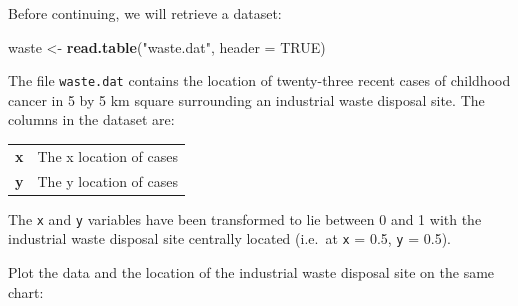 \documentclass[12pt,a4paper]{book}
\newenvironment{Shaded}{\begin{snugshade}}{\end{snugshade}}
\newcommand{\DataTypeTok}[1]{\textcolor[rgb]{0.13,0.29,0.53}{#1}}
\newcommand{\DecValTok}[1]{\textcolor[rgb]{0.00,0.00,0.81}{#1}}
\newcommand{\FloatTok}[1]{\textcolor[rgb]{0.00,0.00,0.81}{#1}}
\newcommand{\KeywordTok}[1]{\textcolor[rgb]{0.13,0.29,0.53}{\textbf{#1}}}
\newcommand{\NormalTok}[1]{#1}
\newcommand{\OperatorTok}[1]{\textcolor[rgb]{0.81,0.36,0.00}{\textbf{#1}}}
\newcommand{\OtherTok}[1]{\textcolor[rgb]{0.56,0.35,0.01}{#1}}
\newcommand{\StringTok}[1]{\textcolor[rgb]{0.31,0.60,0.02}{#1}}
\theoremstyle{definition}
\theoremstyle{definition}
\theoremstyle{definition}
\theoremstyle{remark}
\begin{document}
Before continuing, we will retrieve a dataset:

\begin{Shaded}
\begin{Highlighting}[]
\NormalTok{waste <-}\StringTok{ }\KeywordTok{read.table}\NormalTok{(}\StringTok{"waste.dat"}\NormalTok{, }\DataTypeTok{header =} \OtherTok{TRUE}\NormalTok{)}
\end{Highlighting}
\end{Shaded}

The file \texttt{waste.dat} contains the location of twenty-three recent
cases of childhood cancer in 5 by 5 km square surrounding an industrial
waste disposal site. The columns in the dataset are:

\begin{longtable}[]{@{}ll@{}}
\toprule
\endhead
\begin{minipage}[t]{0.14\columnwidth}\raggedright
\textbf{x}\strut
\end{minipage} & \begin{minipage}[t]{0.41\columnwidth}\raggedright
The x location of cases\strut
\end{minipage}\tabularnewline
\begin{minipage}[t]{0.14\columnwidth}\raggedright
\textbf{y}\strut
\end{minipage} & \begin{minipage}[t]{0.41\columnwidth}\raggedright
The y location of cases\strut
\end{minipage}\tabularnewline
\bottomrule
\end{longtable}

The \texttt{x} and \texttt{y} variables have been transformed to lie
between 0 and 1 with the industrial waste disposal site centrally
located (i.e.~at \texttt{x} = 0.5, \texttt{y} = 0.5).

Plot the data and the location of the industrial waste disposal site on
the same chart:

\begin{Shaded}
\end{Shaded}
\end{document}

